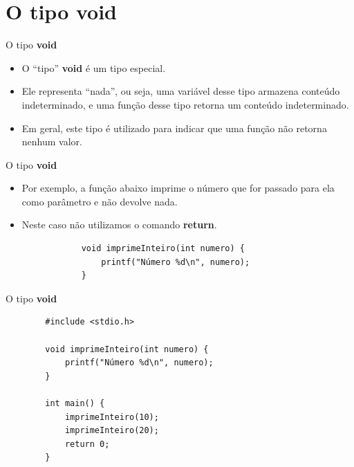 \documentclass[handout]{beamer}
\begin{document}

\section{O tipo void}

\begin{frame}{O tipo {\bf void}}

    \begin{itemize}
        \item O ``tipo'' {\bf void} é um tipo especial.
        \item Ele representa  ``nada'', ou seja, uma variável desse tipo armazena conteúdo indeterminado, e uma função desse tipo retorna um conteúdo indeterminado.
        \item Em geral, este tipo é utilizado para indicar que uma função não retorna nenhum valor.
    \end{itemize}  
\end{frame}

\begin{frame}[fragile]{O tipo {\bf void}}

    \begin{itemize}
        \item Por exemplo, a função abaixo imprime o número que for passado para ela como parâmetro e não devolve nada.
        \item Neste caso não utilizamos o comando {\bf return}.
        
        \begin{verbatim}
            void imprimeInteiro(int numero) {
                printf("Número %d\n", numero);
            }
        \end{verbatim}

    \end{itemize}
\end{frame}

\begin{frame}[fragile]{O tipo {\bf void}}

    \begin{verbatim}
        #include <stdio.h>

        void imprimeInteiro(int numero) {
            printf("Número %d\n", numero);
        }

        int main() {
            imprimeInteiro(10);
            imprimeInteiro(20);
            return 0;
        }
    \end{verbatim}
\end{frame}
\end{document}
